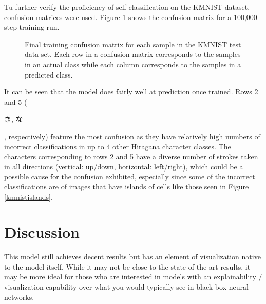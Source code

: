 \documentclass[conference]{IEEEtran}
\begin{document}
Tu further verify the proficiency of self-classification on the KMNIST dataset, confusion matrices were used. Figure \ref{kmnistconfusion} shows the confusion matrix for a 100,000 step training run.

\begin{figure}[htbp]
\caption{ Final training confusion matrix for each sample in the KMNIST test data set. Each row in a confusion matrix corresponds to the samples in an actual class while each column corresponds to the samples in a predicted class.}
\label{kmnistconfusion}
\end{figure}

It can be seen that the model does fairly well at prediction once trained. Rows 2 and 5 (\begin{CJK}{UTF8}{min}き, な\end{CJK}, respectively) feature the most confusion as they have relatively high numbers of incorrect classifications in up to 4 other Hiragana character classes.  The characters corresponding to rows 2 and 5 have a diverse number of strokes taken in all directions (vertical:  up/down, horizontal:  left/right), which could be a possible cause for the confusion exhibited, especially since some of the incorrect classifications are of images that have islands of cells like those seen in Figure \ref{kmnistislands}.

\section{Discussion}

This model still achieves decent results but has an element of visualization native to the model itself. While it may not be close to the state of the art results, it may be more ideal for those who are interested in models with an explainability / visualization capability over what you would typically see in black-box neural networks. 
\end{document}
